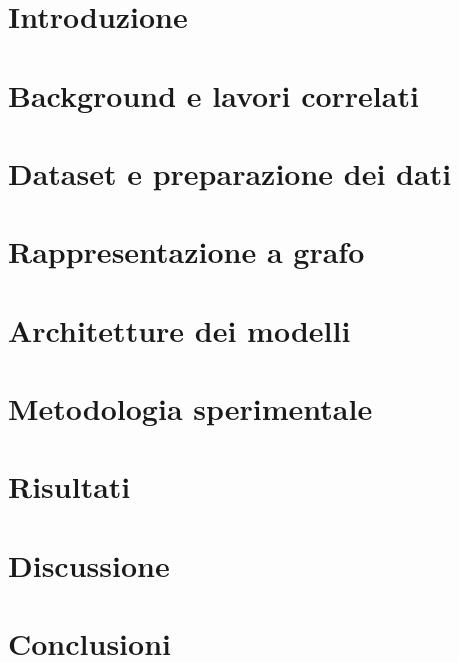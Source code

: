 \documentclass[12pt,a4paper]{report}
\begin{document}
\tableofcontents
\clearpage



\hypersetup{pageanchor=true}

\chapter{Introduzione}


\chapter{Background e lavori correlati}


\chapter{Dataset e preparazione dei dati}


\chapter{Rappresentazione a grafo}


\chapter{Architetture dei modelli}


\chapter{Metodologia sperimentale}
 

\chapter{Risultati}


\chapter{Discussione}


\chapter{Conclusioni}


\printbibliography[heading=bibintoc,title={Bibliografia}]

\begin{appendices}






\let\cleardoublepage\clearpage
\end{appendices}
\end{document}
